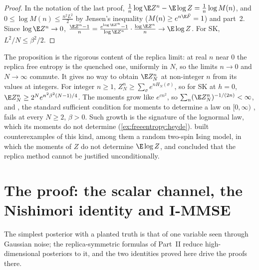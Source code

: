 \begin{refsection}

\begin{proof}
In the notation of the last proof, $\frac1n\log\E Z^n-\E\log Z=\frac1n\log M(n)$, and $0\le\log M(n)\le\frac{n^2L^2}2$ by Jensen's inequality ($M(n)\ge e^{n\E\bar F}=1$) and part~2. Since $\log\E Z^n\to0$, $\frac{\E Z^n-1}n=\frac{e^{\log\E Z^n}-1}{\log\E Z^n}\cdot\frac{\log\E Z^n}n\to\E\log Z$. For SK, $L^2/N\le\beta^2/2$.
\end{proof}

The proposition is the rigorous content of the replica limit: at real $n$ near $0$ the replica free entropy is the quenched one, uniformly in $N$, so the limits $n\to0$ and $N\to\infty$ commute. It gives no way to obtain $\E Z_N^n$ at non-integer $n$ from its values at integers. For integer $n\ge1$, $Z_N^n\ge\sum_\sigma e^{nH_N(\sigma)}$, so for SK at $h=0$, $\E Z_N^n\ge2^Ne^{n^2\beta^2(N-1)/4}$. The moments grow like $e^{cn^2}$, so $\sum_n(\E Z_N^n)^{-1/(2n)}<\infty$, and , the standard sufficient condition for moments to determine a law on $[0,\infty)$ \parencite{Schmudgen2017}, fails at every $N\ge2$, $\beta>0$. Such growth is the signature of the lognormal law, which its moments do not determine \parencite{Heyde1963} (\cref{ex:freeentropy:heyde}). \Textcite{Tanaka2007} built counterexamples of this kind, among them a random two-spin Ising model, in which the moments of $Z$ do not determine $\E\log Z$, and concluded that the replica method cannot be justified unconditionally.

\section{The proof: the scalar channel, the Nishimori identity and I-MMSE}\label{sec:freeentropy:channel}

The simplest posterior with a planted truth is that of one variable seen through Gaussian noise; the replica-symmetric formulas of Part~II reduce high-dimensional posteriors to it, and the two identities proved here drive the proofs there.


\end{refsection}
